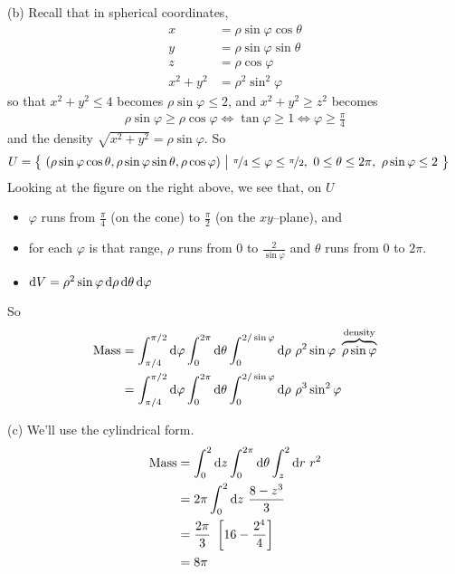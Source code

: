\begin{solution}
(b)
Recall that in spherical coordinates,
\begin{align*}
x&=\rho\sin\varphi\cos\theta \\
y&=\rho\sin\varphi\sin\theta \\
z&=\rho\cos\varphi \\
x^2+y^2 &=\rho^2\sin^2\varphi
\end{align*}
so that $x^2+y^2\le 4$ becomes $\rho\sin\varphi\le 2$,
and $x^2+y^2\ge z^2$ becomes
\begin{align*}
\rho\sin\varphi \ge \rho\cos\varphi 
\iff
\tan\varphi\ge 1
\iff
\varphi\ge\frac{\pi}{4}
\end{align*}
and the density $\sqrt{x^2+y^2}=\rho\sin\varphi$. 
So 
\begin{align*}
U&=\Set{(\rho\sin\varphi\cos\theta,\rho\sin\varphi\sin\theta,\rho\cos\varphi)}
 {\nicefrac{\pi}{4}\le\varphi\le\nicefrac{\pi}{2},\ 
     0\le \theta\le 2\pi,\ \rho\sin\varphi\le 2}
\end{align*}
Looking at the figure on the right above, we see that, on $U$
\begin{itemize}
\item 
  $\varphi$ runs from $\frac{\pi}{4}$ (on the cone) to 
     $\frac{\pi}{2}$ (on the $xy$--plane), and
\item
  for each $\varphi$ is that range, $\rho$ runs from $0$ 
         to $\frac{2}{\sin\varphi}$
  and $\theta$ runs from $0$ to $2\pi$.
\item $\mathrm{d}V =\rho^2\sin\varphi\,\mathrm{d}\rho\,\mathrm{d}\theta\,\mathrm{d}\varphi$
\end{itemize}
So
\begin{align*}
\text{Mass}&= \int_{\pi/4}^{\pi/2}\dee{\varphi}\int_0^{2\pi}\dee{\theta}
            \int_0^{2/\sin\varphi}\dee{\rho}\ 
             \rho^2\sin\varphi\ \overbrace{\rho\sin\varphi}^{\text{density}} \\
&= \int_{\pi/4}^{\pi/2}\dee{\varphi}\int_0^{2\pi}\dee{\theta}
            \int_0^{2/\sin\varphi}\dee{\rho}\ 
                  \rho^3\sin^2\varphi
\end{align*}

(c) We'll use the cylindrical form.
\begin{align*}
\text{Mass}
&= \int_0^2\dee{z}\int_0^{2\pi}\dee{\theta}\int_z^2\dee{r}\ 
                  r^2 \\
&=2\pi \int_0^2\dee{z}\ \frac{8-z^3}{3} \\
&=\frac{2\pi}{3}\ \left[16-\frac{2^4}{4}\right] \\
&=8\pi
\end{align*}
\end{solution}


